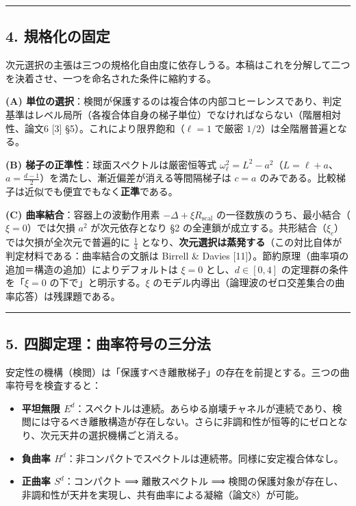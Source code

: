 \documentclass[
]{ltjsarticle}
\providecommand{\tightlist}{%
  \setlength{\itemsep}{0pt}\setlength{\parskip}{0pt}}
\begin{document}
\begin{center}\rule{0.5\linewidth}{0.5pt}\end{center}

\subsection{4. 規格化の固定}\label{ux898fux683cux5316ux306eux56faux5b9a}

次元選択の主張は三つの規格化自由度に依存しうる。本稿はこれを分解して二つを決着させ、一つを命名された条件に縮約する。

\textbf{(A)
単位の選択}：検閲が保護するのは複合体の内部コヒーレンスであり、判定基準はレベル局所（各複合体自身の梯子単位）でなければならない（階層相対性、論文6
{[}3{]} §5）。これにより限界飽和（\(\ell=1\) で厳密
\(1/2\)）は全階層普遍となる。

\textbf{(B) 梯子の正準性}：球面スペクトルは厳密恒等式
\(\omega_\ell^2=L^2-a^2\)（\(L=\ell+a\)、\(a=\tfrac{d-1}2\)）を満たし、漸近偏差が消える等間隔梯子は
\(c=a\) のみである。比較梯子は近似でも便宜でもなく\textbf{正準}である。

\textbf{(C) 曲率結合}：容器上の波動作用素
\(-\Delta+\xi R_{\mathrm{scal}}\)
の一径数族のうち、最小結合（\(\xi=0\)）では欠損 \(a^2\) が次元依存となり
§2 の全連鎖が成立する。共形結合（\(\xi_c\)）では欠損が全次元で普遍的に
\(\tfrac14\)
となり、\textbf{次元選択は蒸発する}（この対比自体が判定材料である：曲率結合の文脈は
Birrell \& Davies
{[}11{]}）。節約原理（曲率項の追加＝構造の追加）によりデフォルトは
\(\xi=0\) とし、\(d\in[0,4]\) の定理群の条件を「\(\xi=0\)
の下で」と明示する。\(\xi\)
のモデル内導出（論理波のゼロ交差集合の曲率応答）は残課題である。

\begin{center}\rule{0.5\linewidth}{0.5pt}\end{center}

\subsection{5.
四脚定理：曲率符号の三分法}\label{ux56dbux811aux5b9aux7406ux66f2ux7387ux7b26ux53f7ux306eux4e09ux5206ux6cd5}

安定性の機構（検閲）は「保護すべき離散梯子」の存在を前提とする。三つの曲率符号を検査すると：

\begin{itemize}
\tightlist
\item
  \textbf{平坦無限
  \(E^d\)}：スペクトルは連続。あらゆる崩壊チャネルが連続であり、検閲には守るべき離散構造が存在しない。さらに非調和性が恒等的にゼロとなり、次元天井の選択機構ごと消える。
\item
  \textbf{負曲率
  \(H^d\)}：非コンパクトでスペクトルは連続帯。同様に安定複合体なし。
\item
  \textbf{正曲率 \(S^d\)}：コンパクト ⟹ 離散スペクトル ⟹
  検閲の保護対象が存在し、非調和性が天井を実現し、共有曲率による凝縮（論文8）が可能。
\end{itemize}
\end{document}
